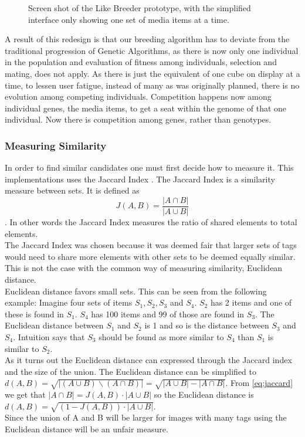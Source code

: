 \documentclass[]{article}
\begin{document}
\begin{figure}[htp]
	\caption{Screen shot of the Like Breeder prototype, with the simplified interface only showing one set of media items at a time.}
	\label{fig:likeBreeder}
\end{figure}

A result of this redesign is that our breeding algorithm has to deviate from the traditional progression of Genetic Algorithms, as there is now only one individual in the population and evaluation of fitness among individuals, selection and mating, does not apply.  As there is just the equivalent of one cube on display at a time, to lessen user fatigue, instead of many as was originally planned, there is no evolution among competing individuals.  Competition happens now among individual genes, the media items, to get a seat within the genome of that one individual.  Now there is competition among genes, rather than genotypes.



\subsubsection{Measuring Similarity}
In order to find similar candidates one must first decide how to measure it. This implementations uses the Jaccard Index \cite{jaccard1912distribution}. The Jaccard Index is a similarity measure between sets. It is defined as
\begin{equation}
\label{eq:jaccard}
J(A,B) = \frac{|A \cap B|}{|A \cup B|}
\end{equation}
. In other words the Jaccard Index measures the ratio of shared elements to total elements.\\
The Jaccard Index was chosen because it was deemed fair that larger sets of tags would need to share more elements with other sets to be deemed equally similar. This is not the case with the common way of measuring similarity, Euclidean distance.\\
Euclidean distance favors small sets. This can be seen from the following example: Imagine four sets of items $S_1, S_2, S_3$ and $S_4$. $S_2$ has 2 items and one of these is found in $S_1$. $S_4$ has 100 items and 99 of those are found in $S_3$. The Euclidean distance between $S_1$ and $S_2$ is 1 and so is the distance between $S_3$ and $S_4$. Intuition says that $S_3$ should be found as more similar to $S_4$ than $S_1$ is similar to $S_2$.\\
As it turns out the Euclidean distance can expressed through the Jaccard index and the size of the union. The Euclidean distance can be simplified to $d(A,B) = \sqrt{|(A \cup B) \backslash (A \cap B)|} = \sqrt{|A \cup B| - |A \cap B|}$. From \autoref{eq:jaccard} we get that $|A \cap B| = J(A,B) \cdot |A \cup B|$ so the Euclidean distance is $d(A,B) = \sqrt{(1 - J(A,B)) \cdot |A \cup B|}$.\\
Since the union of A and B will be larger for images with many tags using the Euclidean distance will be an unfair measure.
\end{document}
